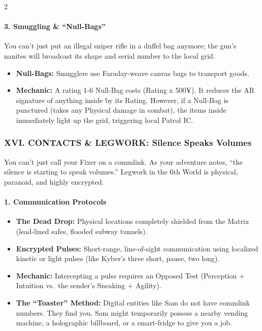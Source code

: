 \documentclass[
  oneside]{article}
\providecommand{\tightlist}{%
  \setlength{\itemsep}{0pt}\setlength{\parskip}{0pt}}
\begin{document}
\begin{multicols}{2}

\hypertarget{smuggling-null-bags}{%
\paragraph{3. Smuggling \&
``Null-Bags''}\label{smuggling-null-bags}}

You can't just put an illegal sniper rifle in a
duffel bag anymore; the gun's nanites will
broadcast its shape and serial number to the local
grid.

\begin{itemize}
\tightlist
\item
  \textbf{Null-Bags:} Smugglers use Faraday-weave
  canvas bags to transport goods.
\item
  \textbf{Mechanic:} A rating 1-6 Null-Bag costs
  (Rating x 500¥). It reduces the AR signature of
  anything inside by its Rating. However, if a
  Null-Bag is punctured (takes any Physical damage
  in combat), the items inside immediately light
  up the grid, triggering local Patrol IC.
\end{itemize}

\hypertarget{xvi.-contacts-legwork-silence-speaks-volumes}{%
\subsubsection{XVI. CONTACTS \& LEGWORK: Silence
Speaks
Volumes}\label{xvi.-contacts-legwork-silence-speaks-volumes}}

You can't just call your Fixer on a commlink. As
your adventure notes, ``the silence is starting to
speak volumes.'' Legwork in the 6th World is
physical, paranoid, and highly encrypted.

\hypertarget{communication-protocols}{%
\paragraph{1. Communication
Protocols}\label{communication-protocols}}

\begin{itemize}
\tightlist
\item
  \textbf{The Dead Drop:} Physical locations
  completely shielded from the Matrix (lead-lined
  safes, flooded subway tunnels).
\item
  \textbf{Encrypted Pulses:} Short-range,
  line-of-sight communication using localized
  kinetic or light pulses (like Kyber's three
  short, pause, two long).
\item
  \textbf{Mechanic:} Intercepting a pulse requires
  an Opposed Test (Perception + Intuition vs.~the
  sender's Sneaking + Agility).
\item
  \textbf{The ``Toaster'' Method:} Digital
  entities like Sam do not have commlink numbers.
  They find you. Sam might temporarily possess a
  nearby vending machine, a holographic billboard,
  or a smart-fridge to give you a job.
\end{itemize}


\end{multicols}
\end{document}
